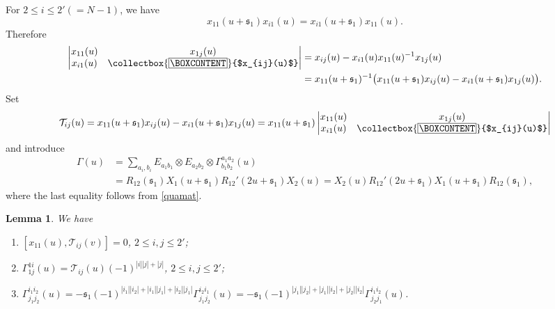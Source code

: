 \documentclass[11pt,reqno]{amsart}
\newcommand{\mybox}{%
    \collectbox{%
        \setlength{\fboxsep}{1pt}%
        \fbox{\BOXCONTENT}%
    }%
}
\numberwithin{equation}{section}
\newtheorem{lem}[thm]{Lemma}
\theoremstyle{definition}
\theoremstyle{remark}
\newcommand{\beq}{\begin{equation}}
\newcommand{\eeq}{\end{equation}}
\newcommand{\mc}{\mathcal}
\newcommand{\lle}{\leqslant}
\newcommand{\ka}{{\mathfrak s}}
\begin{document}
For $2\lle  i\lle 2' (=N-1)$, we have 
\beq\label{emrel1}
x_{11}(u+\ka_1)x_{i 1}(u)=x_{i1}(u+\ka_1)x_{11}(u).
\eeq
Therefore
\begin{align*}
\begin{vmatrix}x_{11}(u) & x_{1j}(u)\\
x_{i1}(u) & \mybox{$x_{ij}(u)$}\end{vmatrix}&=x_{ij}(u)-x_{i1}(u)x_{11}(u)^{-1}x_{1j}(u)\\
&=x_{11}(u+\ka_1)^{-1}\big(x_{11}(u+\ka_1)x_{ij}(u)-x_{i1}(u+\ka_1)x_{1j}(u)\big).
\end{align*}
Set 
\beq\label{newt}
\mc T_{ij}(u)=x_{11}(u+\ka_1)x_{ij}(u)-x_{i1}(u+\ka_1)x_{1j}(u)=x_{11}(u+\ka_1)\begin{vmatrix}x_{11}(u) & x_{1j}(u)\\
x_{i1}(u) & \mybox{$x_{ij}(u)$}\end{vmatrix}
\eeq
and introduce
\beq\label{gamma}
\begin{split}
\Gamma(u)&=\sum_{a_i,b_i}E_{a_1b_1}\otimes E_{a_2b_2}\otimes \Gamma_{b_1b_2}^{a_1a_2}(u)\\
&=R_{12}(\ka_1)X_1(u+\ka_1){R}_{12}'(2u+\ka_1)X_2(u)=X_2(u){R}_{12}'(2u+\ka_1)X_1(u+\ka_1)R_{12}(\ka_1),
\end{split}
\eeq
where the last equality follows from \eqref{quamat}. 
\begin{lem}\label{Blem}
We have
\begin{enumerate}
    \item  $[x_{11}(u),\mc T_{ij}(v)]=0$, $2\lle i,j\lle 2'$;
\item $\Gamma_{1j}^{1i}(u)=\mc T_{ij}(u)(-1)^{|i||j|+|j|}$, $2\lle i,j\lle 2'$;
\item $\Gamma_{j_1j_2}^{i_1i_2}(u)=-\ka_1(-1)^{|i_1||i_2|+|i_1||j_1|+|i_2||j_1|}\Gamma_{j_1j_2}^{i_2i_1}(u)=-\ka_1(-1)^{|j_1||j_2|+|j_1||i_2|+|j_2||i_2|}\Gamma_{j_2j_1}^{i_1i_2}(u)$.
\end{enumerate}
\end{lem}
\end{document}
